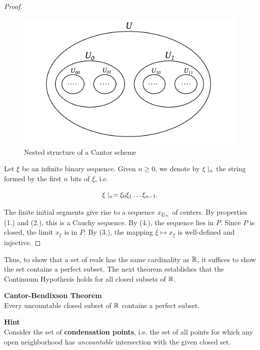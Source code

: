 \begin{proof}
\begin{figure}[!htbp]
\centering
\includegraphics[width=0.7\linewidth]{files/Cantor_Scheme-0b52d5260abb5f7f4d0a22abe7957d4c.png}
\caption[]{Nested structure of a Cantor scheme}
\label{Cantor Scheme}
\end{figure}

Let $\xi$ be an infinite binary sequence. Given $n \geq 0$, we denote by $\xi\mid_{n}$ the string formed by the first $n$ bits of $\xi$, i.e.

\begin{equation}
\xi\mid_{n} = \xi_0 \xi_1 \dots \xi_{n-1}.
\end{equation}

The finite initial segments give rise to a sequence $x_{\xi\mid_{n}}$ of centers. By properties (1.) and (2.), this is a Cauchy sequence. By (4.), the sequence lies in $P$. Since $P$ is closed, the limit $x_\xi$ is in $P$. By (3.), the mapping $\xi \mapsto x_\xi$ is well-defined and injective.

\end{proof}Thus, to show that a set of reals has the same cardinality as $\mathbb{R}$, it suffices to show the set contains a perfect subset. The next theorem establishes that the Continuum Hypothesis holds for all closed subsets of $\mathbb{R}$.

\begin{framed}
\textbf{Cantor-Bendixson Theorem}\\
Every uncountable closed subset of $\mathbb{R}$ contains a perfect subset.
\end{framed}

\begin{framed}
\textbf{Hint}\\
Consider the set of \textbf{condensation points}, i.e. the set of all points for which any open neighborhood has \textit{uncountable} intersection with the given closed set.
\end{framed}

